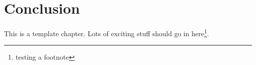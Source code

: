 \chapter{Conclusion}
This is a template chapter. Lots of exciting stuff should go in here\footnote{testing a footnote}.